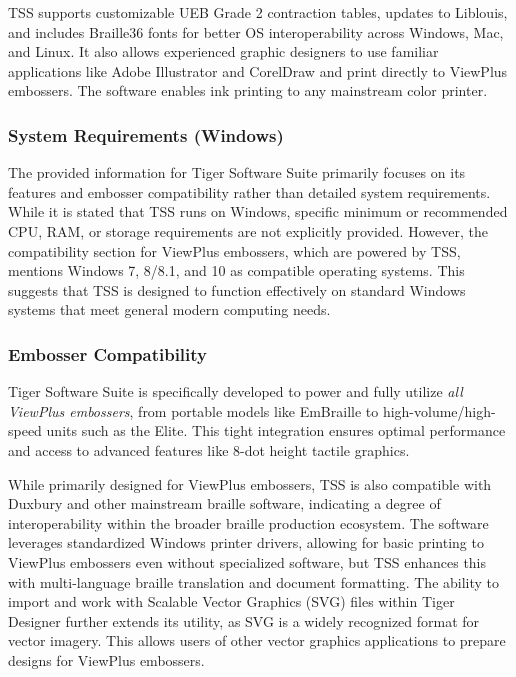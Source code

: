 TSS supports customizable UEB Grade 2 contraction tables, updates to Liblouis, and includes Braille36 fonts for better OS interoperability across Windows, Mac, and Linux.\cite{ElitaManual} It also allows experienced graphic designers to use familiar applications like Adobe Illustrator and CorelDraw and print directly to ViewPlus embossers.\cite{ElitaManual,DuxburyProducts,TouchMapper} The software enables ink printing to any mainstream color printer.\cite{ElitaManual}

\subsubsection{System Requirements (Windows)}

The provided information for Tiger Software Suite primarily focuses on its features and embosser compatibility rather than detailed system requirements. While it is stated that TSS runs on Windows, specific minimum or recommended CPU, RAM, or storage requirements are not explicitly provided.\cite{EmeraldCoast,ElitaManual,DuxburyProducts,NimProQuick} However, the compatibility section for ViewPlus embossers, which are powered by TSS, mentions Windows 7, 8/8.1, and 10 as compatible operating systems.\cite{DuxburyProducts} This suggests that TSS is designed to function effectively on standard Windows systems that meet general modern computing needs.

\subsubsection{Embosser Compatibility}

Tiger Software Suite is specifically developed to power and fully utilize \emph{all ViewPlus embossers}, from portable models like EmBraille to high-volume/high-speed units such as the Elite.\cite{EmeraldCoast,ElitaManual,DuxburyProducts,NimProQuick} This tight integration ensures optimal performance and access to advanced features like 8-dot height tactile graphics.\cite{EmeraldCoast,DuxburyProducts}

While primarily designed for ViewPlus embossers, TSS is also compatible with Duxbury and other mainstream braille software, indicating a degree of interoperability within the broader braille production ecosystem.\cite{EmeraldCoast,ElitaManual,DuxburyProducts,TouchMapper,SteemitInkscape} The software leverages standardized Windows printer drivers, allowing for basic printing to ViewPlus embossers even without specialized software, but TSS enhances this with multi-language braille translation and document formatting.\cite{ElitaManual} The ability to import and work with Scalable Vector Graphics (SVG) files within Tiger Designer further extends its utility, as SVG is a widely recognized format for vector imagery.\cite{ElitaManual,IrieBrailleTrac} This allows users of other vector graphics applications to prepare designs for ViewPlus embossers.

